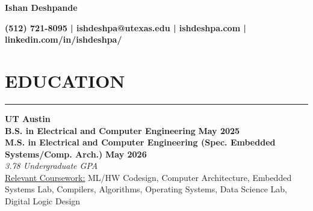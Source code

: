 \documentclass{article}
\newcommand{\sectionHeader}[1]{%
    \vspace{-1.5\baselineskip}
    \section*{\MakeUppercase{\large #1}} %
    \vspace{-1.75\baselineskip} %
    \color{teal}
    \rule{\textwidth}{2pt} %
    \color{black}
    \vspace{-1.5\baselineskip}
}
\begin{document}
\begin{center}
    \textbf{\LARGE Ishan Deshpande}
\end{center}

\begin{center}
    \textbf{\small (512) 721-8095 | ishdeshpa@utexas.edu | ishdeshpa.com | linkedin.com/in/ishdeshpa/}
\end{center}

\sectionHeader{education}       
\begin{flushleft}
    \vspace{2.5pt}
    \textbf{\large UT Austin} \\
    \textbf{B.S. in Electrical and Computer Engineering} \hfill \textbf{May 2025} \\
    \textbf{M.S. in Electrical and Computer Engineering (Spec. Embedded Systems/Comp. Arch.)} \hfill \textbf{May 2026} \\
    \textit{3.78 Undergraduate GPA} \\
    \underline{Relevant Coursework:} ML/HW Codesign, Computer Architecture, Embedded Systems Lab, Compilers, Algorithms, Operating Systems, Data Science Lab, Digital Logic Design
\end{flushleft}
\end{document}

